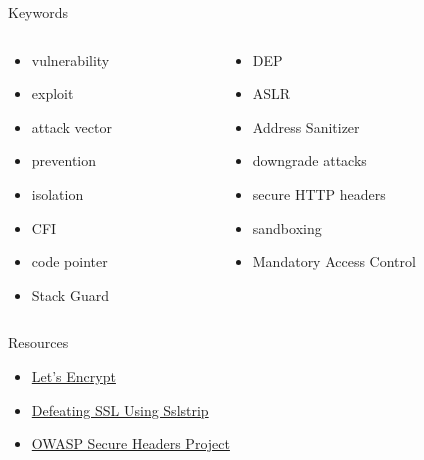 \documentclass{curs}
\begin{document}
\begin{frame}{Keywords}
  \begin{columns}
    \begin{column}{0.5\textwidth}
      \begin{itemize}
        \item vulnerability
        \item exploit
        \item attack vector
        \item prevention
        \item isolation
        \item CFI
        \item code pointer
        \item Stack Guard
      \end{itemize}
    \end{column}
    \begin{column}{0.5\textwidth}
      \begin{itemize}
        \item DEP
        \item ASLR
        \item Address Sanitizer
        \item downgrade attacks
        \item secure HTTP headers
        \item sandboxing
        \item Mandatory Access Control
      \end{itemize}
    \end{column}
  \end{columns}
\end{frame}

\begin{frame}{Resources}
  \begin{itemize}
    \item \href{https://letsencrypt.org/}{Let's Encrypt}
    \item \href{https://www.youtube.com/watch?v=MFol6IMbZ7Y}{Defeating SSL Using Sslstrip}
    \item \href{https://www.owasp.org/index.php/OWASP_Secure_Headers_Project}{OWASP Secure Headers Project}
  \end{itemize}
\end{frame}
\end{document}
